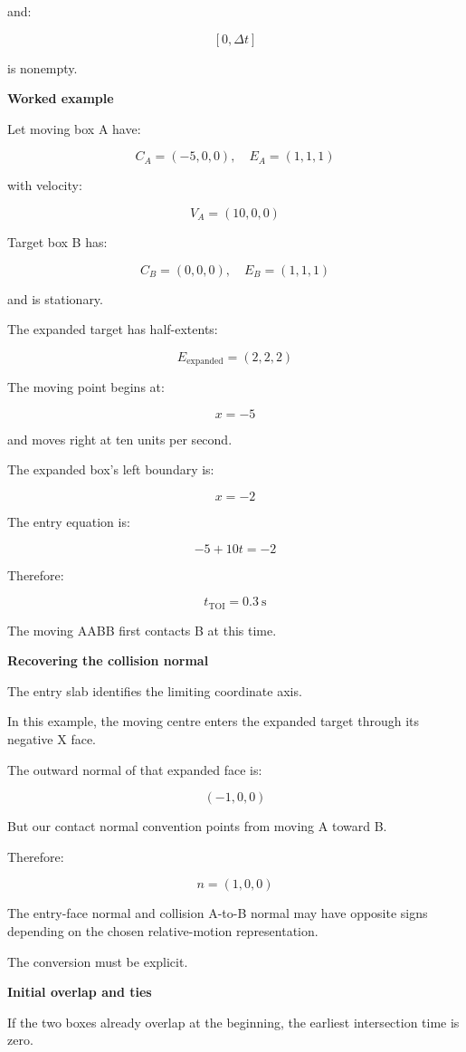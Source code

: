 and:

\[
[0,\Delta t]
\]

is nonempty.

\textbf{Worked example}

Let moving box A have:

\[
C_A=(-5,0,0),\quad E_A=(1,1,1)
\]

with velocity:

\[
V_A=(10,0,0)
\]

Target box B has:

\[
C_B=(0,0,0),\quad E_B=(1,1,1)
\]

and is stationary.

The expanded target has half-extents:

\[
E_{\mathrm{expanded}}=(2,2,2)
\]

The moving point begins at:

\[
x=-5
\]

and moves right at ten units per second.

The expanded box's left boundary is:

\[
x=-2
\]

The entry equation is:

\[
-5+10t=-2
\]

Therefore:

\[
\boxed{ t_{\mathrm{TOI}}=0.3\ \mathrm{s} }
\]

The moving AABB first contacts B at this time.

\textbf{Recovering the collision normal}

The entry slab identifies the limiting coordinate axis.

In this example, the moving centre enters the expanded target through its negative X face.

The outward normal of that expanded face is:

\[
(-1,0,0)
\]

But our contact normal convention points from moving A toward B.

Therefore:

\[
\boxed{ n=(1,0,0) }
\]

The entry-face normal and collision A-to-B normal may have opposite signs depending on the chosen relative-motion representation.

The conversion must be explicit.

\textbf{Initial overlap and ties}

If the two boxes already overlap at the beginning, the earliest intersection time is zero.

